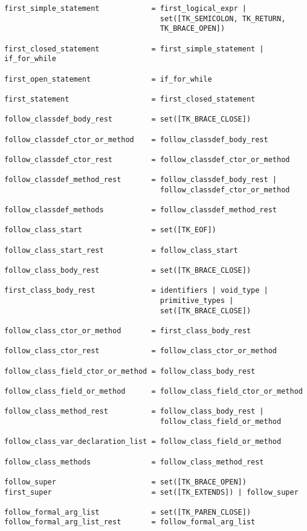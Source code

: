 \documentclass [a4paper,titlepage]{report}
\begin{document}
\begin{verbatim}
first_simple_statement            = first_logical_expr | 
                                    set([TK_SEMICOLON, TK_RETURN, 
                                    TK_BRACE_OPEN])

first_closed_statement            = first_simple_statement | if_for_while 

first_open_statement              = if_for_while

first_statement                   = first_closed_statement

follow_classdef_body_rest         = set([TK_BRACE_CLOSE]) 

follow_classdef_ctor_or_method    = follow_classdef_body_rest

follow_classdef_ctor_rest         = follow_classdef_ctor_or_method

follow_classdef_method_rest       = follow_classdef_body_rest | 
                                    follow_classdef_ctor_or_method

follow_classdef_methods           = follow_classdef_method_rest

follow_class_start                = set([TK_EOF])

follow_class_start_rest           = follow_class_start

follow_class_body_rest            = set([TK_BRACE_CLOSE]) 

first_class_body_rest             = identifiers | void_type | 
                                    primitive_types | 
                                    set([TK_BRACE_CLOSE])

follow_class_ctor_or_method       = first_class_body_rest

follow_class_ctor_rest            = follow_class_ctor_or_method

follow_class_field_ctor_or_method = follow_class_body_rest

follow_class_field_or_method      = follow_class_field_ctor_or_method

follow_class_method_rest          = follow_class_body_rest | 
                                    follow_class_field_or_method

follow_class_var_declaration_list = follow_class_field_or_method

follow_class_methods              = follow_class_method_rest

follow_super                      = set([TK_BRACE_OPEN])
first_super                       = set([TK_EXTENDS]) | follow_super

follow_formal_arg_list            = set([TK_PAREN_CLOSE])
follow_formal_arg_list_rest       = follow_formal_arg_list


\end{verbatim}
\end{document}

